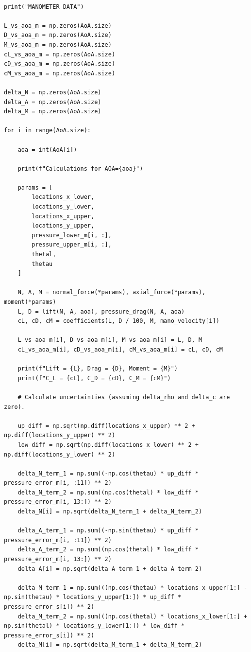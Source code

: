 \documentclass[runningheads]{llncs}
\begin{document}
\begin{verbatim}
    
print("MANOMETER DATA")

L_vs_aoa_m = np.zeros(AoA.size)
D_vs_aoa_m = np.zeros(AoA.size)
M_vs_aoa_m = np.zeros(AoA.size)
cL_vs_aoa_m = np.zeros(AoA.size)
cD_vs_aoa_m = np.zeros(AoA.size)
cM_vs_aoa_m = np.zeros(AoA.size)

delta_N = np.zeros(AoA.size)
delta_A = np.zeros(AoA.size)
delta_M = np.zeros(AoA.size)

for i in range(AoA.size):

    aoa = int(AoA[i])

    print(f"Calculations for AOA={aoa}")

    params = [
        locations_x_lower,
        locations_y_lower,
        locations_x_upper,
        locations_y_upper,
        pressure_lower_m[i, :],
        pressure_upper_m[i, :],
        thetal,
        thetau
    ]

    N, A, M = normal_force(*params), axial_force(*params), moment(*params)
    L, D = lift(N, A, aoa), pressure_drag(N, A, aoa)
    cL, cD, cM = coefficients(L, D / 100, M, mano_velocity[i])

    L_vs_aoa_m[i], D_vs_aoa_m[i], M_vs_aoa_m[i] = L, D, M
    cL_vs_aoa_m[i], cD_vs_aoa_m[i], cM_vs_aoa_m[i] = cL, cD, cM

    print(f"Lift = {L}, Drag = {D}, Moment = {M}")
    print(f"C_L = {cL}, C_D = {cD}, C_M = {cM}")

    # Calculate uncertainties (assuming delta_rho and delta_c are zero).

    up_diff = np.sqrt(np.diff(locations_x_upper) ** 2 + np.diff(locations_y_upper) ** 2)
    low_diff = np.sqrt(np.diff(locations_x_lower) ** 2 + np.diff(locations_y_lower) ** 2)

    delta_N_term_1 = np.sum((-np.cos(thetau) * up_diff * pressure_error_m[i, :11]) ** 2)
    delta_N_term_2 = np.sum((np.cos(thetal) * low_diff * pressure_error_m[i, 13:]) ** 2)
    delta_N[i] = np.sqrt(delta_N_term_1 + delta_N_term_2)

    delta_A_term_1 = np.sum((-np.sin(thetau) * up_diff * pressure_error_m[i, :11]) ** 2)
    delta_A_term_2 = np.sum((np.cos(thetal) * low_diff * pressure_error_m[i, 13:]) ** 2)
    delta_A[i] = np.sqrt(delta_A_term_1 + delta_A_term_2)

    delta_M_term_1 = np.sum(((np.cos(thetau) * locations_x_upper[1:] - np.sin(thetau) * locations_y_upper[1:]) * up_diff * pressure_error_s[i]) ** 2)
    delta_M_term_2 = np.sum(((np.cos(thetal) * locations_x_lower[1:] + np.sin(thetal) * locations_y_lower[1:]) * low_diff * pressure_error_s[i]) ** 2)
    delta_M[i] = np.sqrt(delta_M_term_1 + delta_M_term_2)


\end{verbatim}
\end{document}

